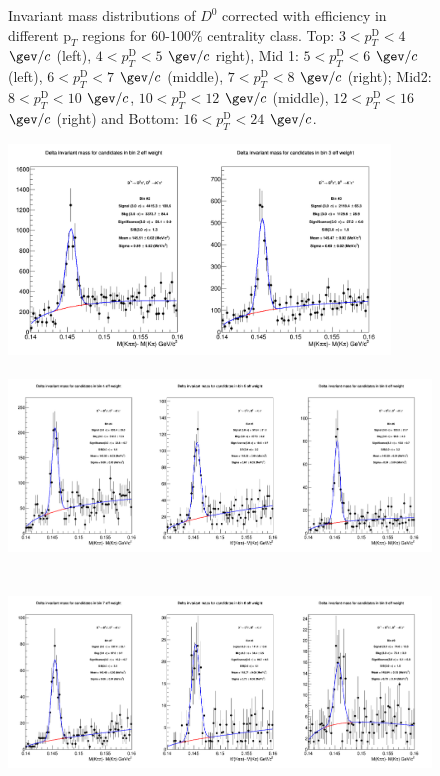 \begin{figure}[!htp]
\caption{Invariant mass distributions of $D^0$ corrected with efficiency in different $\text{p}_T$ regions for 60-100$\%$ centrality class. Top: $3< p_{T}^{\text{D}}< 4$ $\gev/c$ (left), $4< p_{T}^{\text{D}}< 5$ $\gev/c$ right), Mid 1: $5< p_{T}^{\text{D}}< 6$ $\gev/c$ (left), $6 < p_{T}^{\text{D}} < 7$ $\gev/c$ (middle), $7< p_{T}^{\text{D}}< 8$ $\gev/c$ (right); Mid2: $8< p_{T}^{\text{D}}< 10$ $\gev/c$, $10< p_{T}^{\text{D}}< 12$ $\gev/c$  (middle), $12 < p_{T}^{\text{D}}< 16$ $\gev/c$  (right) and Bottom: $16<p_{T}^{\text{D}}< 24$ $\gev/c$.}
\label{fig:InvMassD060100}
\end{figure}


\begin{figure}[!htp]
\centering
{\includegraphics[width=1\linewidth, height=5.6cm]{figuresVsCent/Dstar/MassPlots/60100/InvMassDistributions_Dstar_Bins2to3.png}}
{\includegraphics[width=1\linewidth, height=5.6cm]{figuresVsCent/Dstar/MassPlots/60100/InvMassDistributions_Dstar_Bins4to6.png}}
{\includegraphics[width=1\linewidth, height=5.6cm]{figuresVsCent/Dstar/MassPlots/60100/InvMassDistributions_Dstar_Bins7to9.png}}

\end{figure}
